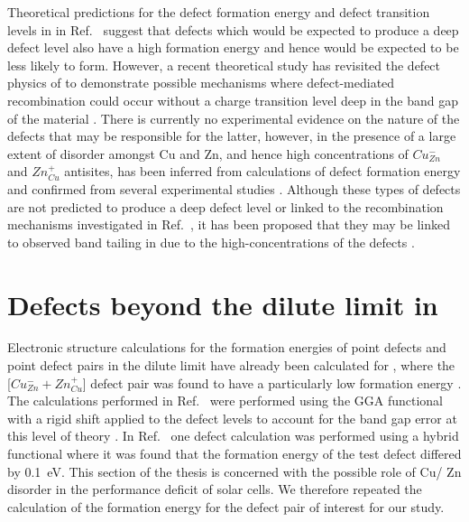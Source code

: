 \documentclass[11pt, twoside]{report}
\begin{document}
Theoretical predictions for the defect formation energy and defect transition levels in {\CZTS} in Ref.~ suggest that defects which would be expected to produce a deep defect level also have a high formation energy and hence would be expected to be less likely to form.
However, a recent theoretical study has revisited the defect physics of {\CZTS} to demonstrate possible mechanisms where defect-mediated recombination could occur without a charge transition level deep in the band gap of the material \cite{Sunghyun_killer_defects}.
There is currently no experimental evidence on the nature of the defects that may be responsible for the latter, however, in {\CZTS} the presence of a large extent of disorder amongst Cu and Zn, and hence high concentrations of $Cu_{Zn}^{-}$ and $Zn_{Cu}^{+}$ antisites, has been inferred from calculations of defect formation energy \cite{defects_Chen} and confirmed from several experimental studies \cite{Schorr, CZTS_Xray, CZTS_TEM}. Although these types of defects are not predicted to produce a deep defect level or linked to the recombination mechanisms investigated in Ref.~, it has been proposed that they may be linked to observed band tailing in {\CZTS} due to the high-concentrations of the defects \cite{band_tail}.




\section{Defects beyond the dilute limit in {\CZTS}}\label{CZTS_beyond_dilute}
Electronic structure calculations for the formation energies of point defects and point defect pairs in the dilute limit have already been calculated for {\CZTS}, where the [$Cu_{Zn}^- + Zn_{Cu}^+$] defect pair was found to have a particularly low formation energy \cite{defects_Chen}.
The calculations performed in Ref.~ were performed using the GGA functional with a rigid shift applied to the defect levels to account for the band gap error at this level of theory \cite{Lany_defects}. In Ref.~ one defect calculation was performed using a hybrid functional where it was found that the formation energy of the test defect differed by \SI{0.1}{eV}. This section of the thesis is concerned with the possible role of Cu/ Zn disorder in the performance deficit of {\CZTS} solar cells. We therefore repeated the calculation of the formation energy for the defect pair of interest for our study.
\end{document}
